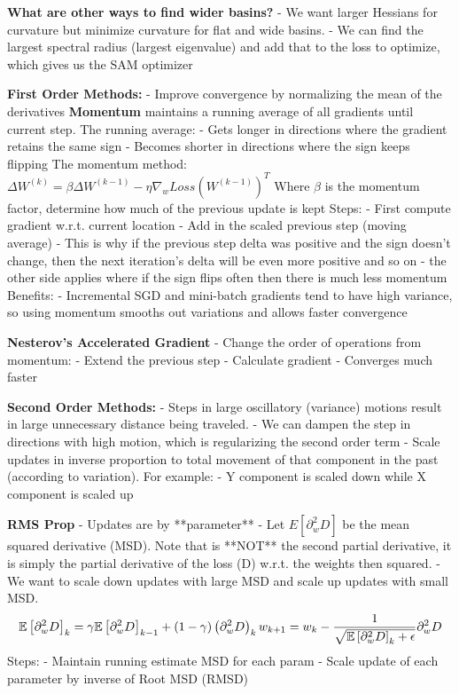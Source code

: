 \textbf{What are other ways to find wider basins?}
- We want larger Hessians for curvature but minimize curvature for flat and wide basins. 
- We can find the largest spectral radius (largest eigenvalue) and add that to the loss to optimize, which gives us the SAM optimizer 

\textbf{First Order Methods:} 
- Improve convergence by normalizing the mean of the derivatives
\textbf{Momentum} 
maintains a running average of all gradients until current step. The running average: 
- Gets longer in directions where the gradient retains the same sign 
- Becomes shorter in directions where the sign keeps flipping 
The momentum method: 
$\Delta W^{(k)} = \beta \Delta W^{(k-1)} - \eta \nabla_{w}Loss(W^{(k-1)})^{T}$
Where $\beta$ is the momentum factor, determine how much of the previous update is kept
Steps: 
- First compute gradient w.r.t. current location 
- Add in the scaled previous step (moving average)
	- This is why if the previous step delta was positive and the sign doesn't change, then the next iteration's delta will be even more positive and so on 
	- the other side applies where if the sign flips often then there is much less momentum 
Benefits: 
- Incremental SGD and mini-batch gradients tend to have high variance, so using momentum smooths out variations and allows faster convergence

\textbf{Nesterov's Accelerated Gradient}
- Change the order of operations from momentum: 
	- Extend the previous step
	- Calculate gradient
- Converges much faster

\textbf{Second Order Methods:} 
- Steps in large oscillatory (variance) motions result in large unnecessary distance being traveled. 
- We can dampen the step in directions with high motion, which is regularizing the second order term
- Scale updates in inverse proportion to total movement of that component in the past (according to variation). For example:
- Y component is scaled down while X component is scaled up

\textbf{RMS Prop}
- Updates are by **parameter**
- Let $E\left[\partial^{2}_{w}D\right]$ be the mean squared derivative (MSD). Note that is **NOT** the second partial derivative, it is simply the partial derivative of the loss (D) w.r.t. the weights then squared. 
- We want to scale down updates with large MSD and scale up updates with small MSD. 
\begin{equation}
\mathbb{E}\left[\partial^{2}_{w}D\right]_{k} = \gamma \mathbb{E}\left[\partial^{2}_{w}D\right]_{k-1} + (1-\gamma) \left(\partial^{2}_{w}D\right)_{k} \\
w_{k+1}= w_{k}- \frac{1}{\sqrt{\mathbb{E}\left[\partial^{2}_{w}D\right]_{k}+ \epsilon}}\partial_{w}^{2}D
\end{equation}
Steps: 
- Maintain running estimate MSD for each param 
- Scale update of each parameter by inverse of Root MSD (RMSD)

